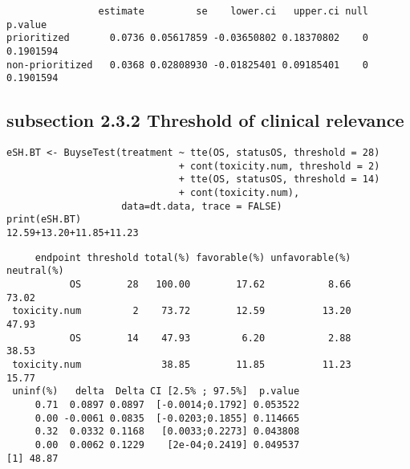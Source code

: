 \documentclass[12pt]{article}
\begin{document}
\begin{verbatim}
                estimate         se    lower.ci   upper.ci null   p.value
prioritized       0.0736 0.05617859 -0.03650802 0.18370802    0 0.1901594
non-prioritized   0.0368 0.02808930 -0.01825401 0.09185401    0 0.1901594
\end{verbatim}

\subsection{subsection 2.3.2 Threshold of clinical relevance}
\label{sec:orgd7e3df2}
\lstset{language=r,label= ,caption= ,captionpos=b,numbers=none}
\begin{lstlisting}
eSH.BT <- BuyseTest(treatment ~ tte(OS, statusOS, threshold = 28)
                              + cont(toxicity.num, threshold = 2)
                              + tte(OS, statusOS, threshold = 14)
                              + cont(toxicity.num),
                    data=dt.data, trace = FALSE)
print(eSH.BT)
12.59+13.20+11.85+11.23
\end{lstlisting}

\begin{verbatim}
     endpoint threshold total(%) favorable(%) unfavorable(%) neutral(%)
           OS        28   100.00        17.62           8.66      73.02
 toxicity.num         2    73.72        12.59          13.20      47.93
           OS        14    47.93         6.20           2.88      38.53
 toxicity.num              38.85        11.85          11.23      15.77
 uninf(%)   delta  Delta CI [2.5% ; 97.5%]  p.value
     0.71  0.0897 0.0897  [-0.0014;0.1792] 0.053522
     0.00 -0.0061 0.0835  [-0.0203;0.1855] 0.114665
     0.32  0.0332 0.1168   [0.0033;0.2273] 0.043808
     0.00  0.0062 0.1229    [2e-04;0.2419] 0.049537
[1] 48.87
\end{verbatim}
\end{document}
